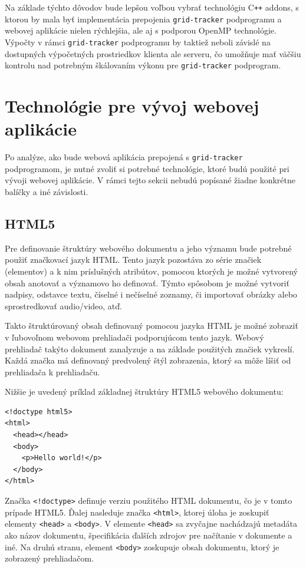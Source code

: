 Na základe týchto dôvodov bude lepšou voľbou vybrať technológiu C\texttt{++} addons, s ktorou by mala byť implementácia prepojenia \texttt{grid-tracker} podprogramu a webovej aplikácie nielen rýchlejšia, ale aj s podporou OpenMP technológie. Výpočty v rámci \texttt{grid-tracker} podprogramu by taktiež neboli závislé na dostupných výpočetných prostriedkov klienta ale serveru, čo umožňuje mať väčšiu kontrolu nad potrebným škálovaním výkonu pre \texttt{grid-tracker} podprogram. 

\section {Technológie pre vývoj webovej aplikácie}
Po analýze, ako bude webová aplikácia prepojená s \texttt{grid-tracker} podprogramom, je nutné zvoliť si potrebné technológie, ktoré budú použité pri vývoji webovej aplikácie. V rámci tejto sekcii nebudú popísané žiadne konkrétne balíčky a iné závislosti.

\subsection {HTML5}
Pre definovanie štruktúry webového dokumentu a jeho významu bude potrebné použiť značkovací jazyk HTML. Tento jazyk pozostáva zo série značiek (elementov) a k nim príslušných atribútov, pomocou ktorých je možné vytvorený obsah anotovať a významovo ho definovať. Týmto spôsobom je možné vytvoriť nadpisy, odstavce textu, číselné i nečíselné zoznamy, či importovať obrázky alebo sprostredkovať audio/video, atď.

Takto štruktúrovaný obsah definovaný pomocou jazyka HTML je možné zobraziť v ľubovoľnom webovom prehliadači podporujúcom tento jazyk. Webový prehliadač takýto dokument zanalyzuje a na základe použitých značiek vykreslí. Každá značka má definovaný predvolený štýl zobrazenia, ktorý sa môže líšiť od prehliadača k prehliadaču.

Nižšie je uvedený príklad základnej štruktúry HTML5 webového dokumentu:
\begin{verbatim}
<!doctype html5>
<html>
  <head></head>
  <body>
    <p>Hello world!</p>
  </body>
</html>
\end{verbatim}

Značka \texttt{<!doctype>} definuje verziu použitého HTML dokumentu, čo je v tomto prípade HTML5. Ďalej nasleduje značka \texttt{<html>}, ktorej úloha je zoskupiť elementy \texttt{<head>} a \texttt{<body>}. V elemente \texttt{<head>} sa zvyčajne nachádzajú metadáta ako názov dokumentu, špecifikácia ďalších zdrojov pre načítanie v dokumente a iné. Na druhú stranu, element \texttt{<body>} zoskupuje obsah dokumentu, ktorý je zobrazený prehliadačom.


